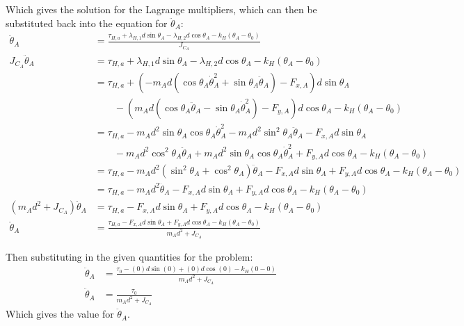 \documentclass[titlepage]{article}
\begin{document}
Which gives the solution for the Lagrange multipliers, which can then be substituted back into the equation for $\ddot{\theta}_A$:
\begin{equation}
	\begin{split}
		\ddot{\theta}_A&=\frac{\tau_{H,a}+\lambda_{H,1}d\sin\theta_A-\lambda_{H,2}d\cos\theta_A-k_H\left(\theta_A-\theta_0\right)}{J_{C_A}} \\
		J_{C_A}\ddot{\theta}_A&=\tau_{H,a}+\lambda_{H,1}d\sin\theta_A-\lambda_{H,2}d\cos\theta_A-k_H\left(\theta_A-\theta_0\right) \\
		&=\tau_{H,a}+\left(-m_Ad\left(\cos\theta_A\dot{\theta}_A^2+\sin\theta_A\ddot{\theta}_A\right)-F_{x,A}\right)d\sin\theta_A \\
		&\qquad-\left(m_Ad\left(\cos\theta_A\ddot{\theta}_A-\sin\theta_A\dot{\theta}_A^2\right)-F_{y,A}\right)d\cos\theta_A-k_H\left(\theta_A-\theta_0\right) \\
		&=\tau_{H,a}-m_Ad^2\sin\theta_A\cos\theta_A\dot{\theta}_A^2-m_Ad^2\sin^2\theta_A\ddot{\theta}_A-F_{x,A}d\sin\theta_A \\
		&\qquad-m_Ad^2\cos^2\theta_A\ddot{\theta}_A+m_Ad^2\sin\theta_A\cos\theta_A\dot{\theta}_A^2+F_{y,A}d\cos\theta_A-k_H\left(\theta_A-\theta_0\right) \\
		&=\tau_{H,a}-m_Ad^2\left(\sin^2\theta_A+\cos^2\theta_A\right)\ddot{\theta}_A-F_{x,A}d\sin\theta_A+F_{y,A}d\cos\theta_A-k_H\left(\theta_A-\theta_0\right) \\
		&=\tau_{H,a}-m_Ad^2\ddot{\theta}_A-F_{x,A}d\sin\theta_A+F_{y,A}d\cos\theta_A-k_H\left(\theta_A-\theta_0\right) \\
		\left(m_Ad^2+J_{C_A}\right)\ddot{\theta}_A&=\tau_{H,a}-F_{x,A}d\sin\theta_A+F_{y,A}d\cos\theta_A-k_H\left(\theta_A-\theta_0\right) \\
		\ddot{\theta}_A&=\frac{\tau_{H,a}-F_{x,A}d\sin\theta_A+F_{y,A}d\cos\theta_A-k_H\left(\theta_A-\theta_0\right)}{m_Ad^2+J_{C_A}}
	\end{split}
\end{equation}


\begin{mdframed}[linewidth=1pt, innertopmargin=10pt, innerbottommargin=10pt]
	Then substituting in the given quantities for the problem:
	\begin{equation}
		\begin{split}
			\ddot{\theta}_A&=\frac{\tau_0-(0)d\sin(0)+(0)d\cos(0)-k_H\left(0-0\right)}{m_Ad^2+J_{C_A}} \\
			\ddot{\theta}_A&=\frac{\tau_0}{m_Ad^2+J_{C_A}}
		\end{split}
	\end{equation}
	Which gives the value for $\ddot{\theta}_A$.
\end{mdframed}
\end{document}
